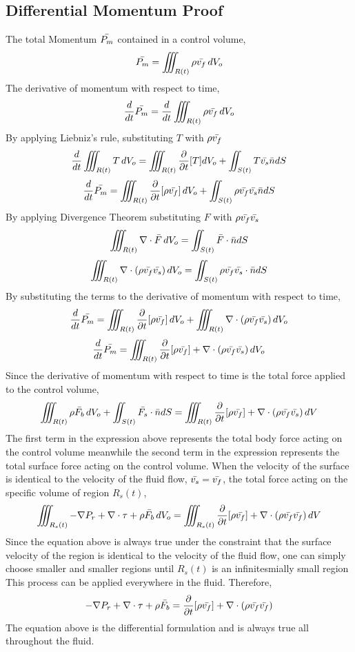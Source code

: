 \documentclass[class=report, 12pt, crop=false]{standalone}
\begin{document}
\begin{center}
\subsection{Differential Momentum Proof}
\begin{comment}
\end{comment}
The total Momentum $\bar{P_m}$ contained in a control volume,
$$\bar{P_m} = \iiint_{R(t)}\rho \bar{v_f} \,dV_o$$
The derivative of momentum with respect to time,
$$\frac{d}{dt}\bar{P_m} = \frac{d}{dt} \iiint_{R(t)}\rho \bar{v_f} \,dV_o$$
By applying Liebniz's rule, substituting $T$ with $\rho \bar{v_f}$
$$\frac{d}{dt}\iiint_{R(t)}T\,dV_o = \iiint_{R(t)}\frac{\partial}{\partial t}[T]dV_o + \iint_{S(t)}T\bar{v_s}\bar{n}dS$$
$$\frac{d}{dt}\bar{P_m} = \iiint_{R(t)}\frac{\partial}{\partial t}[\rho \bar{v_f}]\,dV_o + \iint_{S(t)}\rho \bar{v_f}\bar{v_s}\bar{n}dS$$
By applying Divergence Theorem substituting $F$ with $\rho \bar{v_f}\bar{v_s}$
$$\iiint_{R(t)}  \nabla \cdot \bar{F} \,dV_o = \iint_{S(t)}\bar{F}\cdot \bar{n}dS$$
$$\iiint_{R(t)}  \nabla \cdot (\rho \bar{v_f}\bar{v_s}) \,dV_o = \iint_{S(t)} \rho \bar{v_f}\bar{v_s} \cdot \bar{n}dS$$
By substituting the terms to the derivative of momentum with respect to time,
$$\frac{d}{dt}\bar{P_m} = \iiint_{R(t)}\frac{\partial}{\partial t}[\rho \bar{v_f}]\,dV_o + \iiint_{R(t)}  \nabla \cdot (\rho \bar{v_f}\bar{v_s}) \,dV_o$$
$$\frac{d}{dt}\bar{P_m} = \iiint_{R(t)}\frac{\partial}{\partial t}[\rho \bar{v_f}] + \nabla \cdot (\rho \bar{v_f}\bar{v_s}) \,dV_o$$
Since the derivative of momentum with respect to time is the total force applied to the control volume,
$$\iiint_{R(t)}\rho \bar{F_b} \,dV_o + \iint_{S(t)} \bar{F_s} \cdot \bar{n}dS = \iiint_{R(t)}\frac{\partial}{\partial t}[\rho \bar{v_f}] + \nabla \cdot (\rho \bar{v_f}\bar{v_s}) \,dV$$
The first term in the expression above represents the total body force acting on the control volume meanwhile the second term in the expression represents the total surface force acting on the control volume. When the velocity of the surface is identical to the velocity of the fluid flow, $\bar{v_s} = \bar{v_f}$, the total force acting on the specific volume of region $R_s(t)$,
$$\iiint_{R_s(t)} -\nabla P_r + \nabla \cdot \tau + \rho \bar{F_b} \,dV_o = \iiint_{R_s(t)}\frac{\partial}{\partial t}[\rho \bar{v_f}] + \nabla \cdot (\rho \bar{v_f}\bar{v_f}) \,dV$$
Since the equation above is always true under the constraint that the surface velocity of the region is identical to the velocity of the fluid flow, one can simply choose smaller and smaller regions until $R_s(t)$ is an infinitesmially small region This process can be applied everywhere in the fluid. Therefore,
$$ -\nabla P_r + \nabla \cdot \tau + \rho \bar{F_b} = \frac{\partial}{\partial t}[\rho \bar{v_f}] + \nabla \cdot (\rho \bar{v_f}\bar{v_f})$$
The equation above is the differential formulation and is always true all throughout the fluid. 

\end{center}
\end{document}
